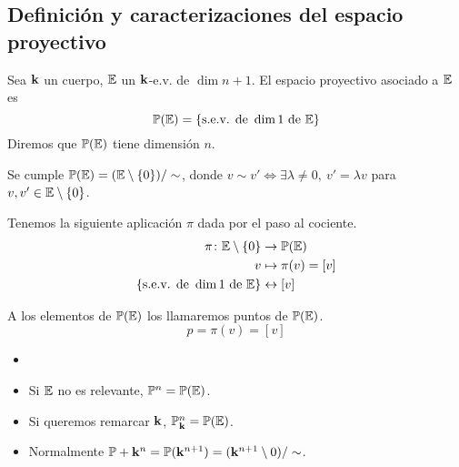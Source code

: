 \subsection{Definición y caracterizaciones del espacio proyectivo}
\begin{defi}
	Sea $\mathbf{k}$ un cuerpo, $\mathbb{E}$ un $\mathbf{k}$-e.v. de $\dim n+1$. El espacio proyectivo asociado a $\mathbb{E}$ es 
	\[\mathbb{P} (\mathbb{E}) = \left\{\text{s.e.v. de } \dim 1 \text{ de } \mathbb{E}\right\}\]
	Diremos que $\mathbb{P} (\mathbb{E})$ tiene dimensión $n$.
\end{defi}
\begin{obs}
	Se cumple $\mathbb{P} (\mathbb{E}) = (\mathbb{E} \setminus \left\{0\right\}) / \sim$, donde $v \sim v'  \iff \exists \lambda \neq 0, \ v' = \lambda v$ para
	$v, v' \in \mathbb{E} \setminus \left\{0\right\}$.
\end{obs}
\begin{defi}
	Tenemos la siguiente aplicación $\pi$ dada por el paso al cociente.
	\[
	\begin{aligned}
	\pi \colon \mathbb{E} \setminus \left\{0\right\} &\to \mathbb{P} (\mathbb{E})\\
	v &\mapsto \pi(v) = [v]\\
	\left\{\text{s.e.v. de } \dim 1 \text{ de } \mathbb{E}\right\} &\leftrightarrow [v]
	\end{aligned}
	\]
\end{defi}
\begin{defi}
	A los elementos de $\mathbb{P} (\mathbb{E})$ los llamaremos puntos de $\mathbb{P} (\mathbb{E})$.
	\[p = \pi(v) = [v]\]
\end{defi}
\begin{obs}
	\begin{itemize}
		\item[]
		\item Si $\mathbb{E}$ no es relevante, $\mathbb{P}^n = \mathbb{P} (\mathbb{E})$.
		\item Si queremos remarcar $\mathbf{k}$, $\mathbb{P}_{\mathbf{k}}^n = \mathbb{P} (\mathbb{E})$.
		\item Normalmente $\mathbb{P}+\mathbf{k}^n = \mathbb{P}(\mathbf{k}^{n+1}) = (\mathbf{k}^{n+1} \setminus {0})/\sim$.
	\end{itemize}
\end{obs}
